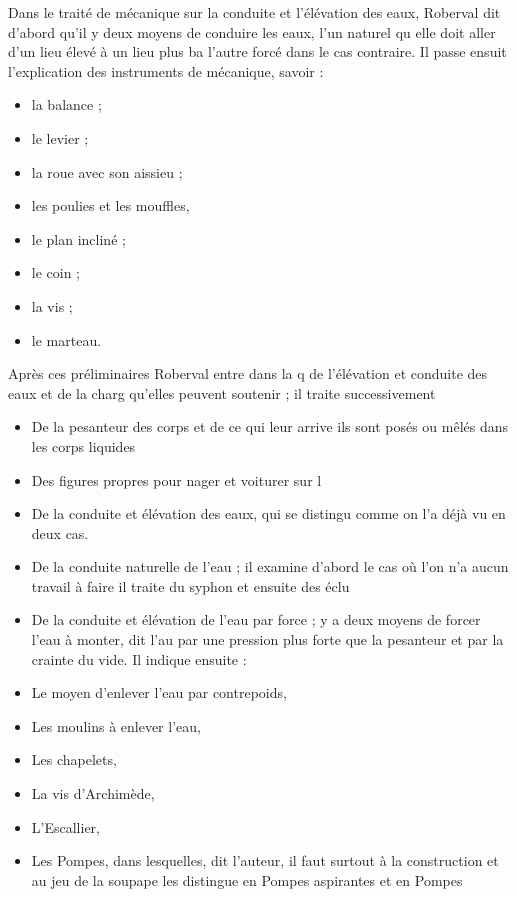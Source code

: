 \documentclass[11pt,a4paper]{article}
\begin{document}
Dans le traité de mécanique sur la conduite et l'élévation des eaux, Roberval dit d'abord qu'il y \ill{} deux moyens de conduire les eaux, l'un naturel qu\ill{} elle doit aller d'un lieu élevé à un lieu plus ba l'autre forcé dans le cas contraire. Il passe ensuit l'explication des instruments de mécanique, savoir :
\begin{itemize}
  \item[177.] la balance ;
  \item[197] le levier ;
  \item[204] la roue avec son aissieu ;
  \item[222] les poulies et les mouffles,
  \item[236] le plan incliné ;
  \item[260] le coin ;
  \item[267] la vis ;
  \item[270] le marteau.
\end{itemize}

Après ces préliminaires Roberval entre dans la q\ill{} de l'élévation et conduite des eaux et de la charg\ill{} qu'elles peuvent soutenir ; il traite successivement
\begin{itemize}
  \item[300] De la pesanteur des corps et de ce qui leur arrive \ill{} ils sont posés ou mêlés dans les corps liquides
  \item[329] Des figures propres pour nager et voiturer sur l\ill{}
  \item[335] De la conduite et élévation des eaux, qui se distingu\ill{} comme on l'a déjà vu en deux cas.
  \item[336] De la conduite naturelle de l'eau ; il examine d'abord le cas où l'on n'a aucun travail à faire\ill{} il traite du syphon et ensuite des éclu
  \item[364] De la conduite et élévation de l'eau par force ; \ill{} y a deux moyens de forcer l'eau à monter, dit l'au par une pression plus forte que la pesanteur et par la crainte du vide. Il indique ensuite :
  \item[367] Le moyen d'enlever l'eau par contrepoids,
  \item[374] Les moulins à enlever l'eau,
  \item[378] Les chapelets,
  \item[386] La vis d'Archimède,
  \item[390] L'Escallier,
  \item[393] Les Pompes, dans lesquelles, dit l'auteur, il faut \ill{} surtout à la construction et au jeu de la soupape\ill{} les distingue en Pompes aspirantes et en Pompes
\end{itemize}
\end{document}
